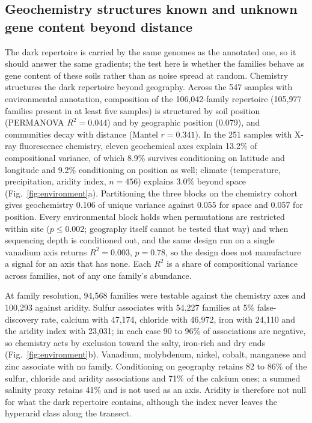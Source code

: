 \documentclass[11pt]{article}
\begin{document}
\subsection*{Geochemistry structures known and unknown gene content beyond distance}

The dark repertoire is carried by the same genomes as the annotated one, so it should answer the same
gradients; the test here is whether the families behave as gene content of these soils rather than
as noise spread at random. Chemistry structures the dark repertoire beyond geography. Across the 547
samples with environmental annotation, composition of the 106{,}042-family repertoire (105{,}977
families present in at least five samples) is structured by soil position (PERMANOVA $R^2 = 0.044$)
and by geographic position (0.079), and communities decay with distance (Mantel $r = 0.341$). In the
251 samples with X-ray fluorescence chemistry, eleven geochemical axes explain 13.2\% of
compositional variance, of which 8.9\% survives conditioning on latitude and longitude and 9.2\%
conditioning on position as well; climate (temperature, precipitation, aridity index, $n = 456$)
explains 3.0\% beyond space (Fig.~\ref{fig:environment}a). Partitioning the three blocks on the
chemistry cohort gives geochemistry 0.106 of unique variance against 0.055 for space and 0.057 for
position. Every environmental block holds when permutations are restricted within site
($p \leq 0.002$; geography itself cannot be tested that way) and when sequencing depth is conditioned
out, and the same design run on a single vanadium axis returns $R^2 = 0.003$, $p = 0.78$, so the
design does not manufacture a signal for an axis that has none. Each $R^2$ is a share of
compositional variance across families, not of any one family's abundance.

At family resolution, 94{,}568 families were testable against the chemistry axes and 100{,}293
against aridity. Sulfur associates with 54{,}227 families at 5\% false-discovery rate, calcium
with 47{,}174, chloride with 46{,}972, iron with 24{,}110 and the aridity index with 23{,}031; in
each case 90 to 96\% of associations are negative, so chemistry acts by exclusion toward the salty,
iron-rich and dry ends (Fig.~\ref{fig:environment}b). Vanadium, molybdenum, nickel, cobalt,
manganese and zinc associate with no family. Conditioning on geography retains 82 to 86\% of the
sulfur, chloride and aridity associations and 71\% of the calcium ones; a summed salinity proxy
retains 41\% and is not used as an axis. Aridity is therefore not null for what the dark repertoire
contains, although the index never leaves the hyperarid class along the transect.
\end{document}
